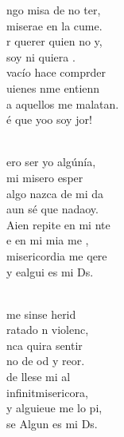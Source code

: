 \begin{cancion}%
	ngo misa de no ter,\\
	 miserae en la cume.\\
	r querer  quien no y,\\
	soy ni quiera .\\
\jump
	 vacío hace comprder\\
	uienes nme entienn\\
	a aquellos  me malatan.\\
	é que yoo soy jor!\\\jump\\
	\begin{chorus}%
	ero ser yo algúnía,\\
	 mi misero esper\\
	 algo nazca de mi da\\
	aun sé que nadaoy.\\
\jump
	Aien repite en mi nte\\
	e en mi mia me ,\\
	 misericordia me qere\\
	y ealgui es mi Ds.\\
	\end{chorus}%
	\jump\\
	 me sinse herid\\
	ratado n violenc,\\
	nca quira sentir\\
	no de od y reor.\\
\jump
	 de llese mi al\\
	infinitmisericora,\\
	y alguieue me lo pi,\\
	se Algun es mi Ds.\\
\end{cancion}%
